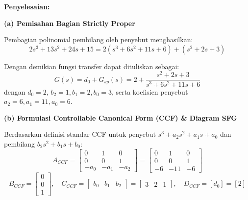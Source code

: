 \documentclass[11pt,a4paper]{article}
\begin{document}
\textbf{Penyelesaian:}

\textbf{(a) Pemisahan Bagian Strictly Proper}

Pembagian polinomial pembilang oleh penyebut menghasilkan:
$$2s^3 + 13s^2 + 24s + 15 = 2(s^3 + 6s^2 + 11s + 6) + (s^2 + 2s + 3)$$

Dengan demikian fungsi transfer dapat dituliskan sebagai:
$$G(s) = d_0 + G_{sp}(s) = 2 + \frac{s^2 + 2s + 3}{s^3 + 6s^2 + 11s + 6}$$
dengan $d_0 = 2$, $b_2 = 1, b_1 = 2, b_0 = 3$, serta koefisien penyebut $a_2 = 6, a_1 = 11, a_0 = 6$.

\textbf{(b) Formulasi Controllable Canonical Form (CCF) \& Diagram SFG}

Berdasarkan definisi standar CCF untuk penyebut $s^3 + a_2 s^2 + a_1 s + a_0$ dan pembilang $b_2 s^2 + b_1 s + b_0$:
$$A_{CCF} = \begin{bmatrix} 0 & 1 & 0 \\ 0 & 0 & 1 \\ -a_0 & -a_1 & -a_2 \end{bmatrix} = \begin{bmatrix} 0 & 1 & 0 \\ 0 & 0 & 1 \\ -6 & -11 & -6 \end{bmatrix}$$
$$B_{CCF} = \begin{bmatrix} 0 \\ 0 \\ 1 \end{bmatrix}, \quad C_{CCF} = \begin{bmatrix} b_0 & b_1 & b_2 \end{bmatrix} = \begin{bmatrix} 3 & 2 & 1 \end{bmatrix}, \quad D_{CCF} = [d_0] = [2]$$

\begin{center}
\end{center}
\end{document}
